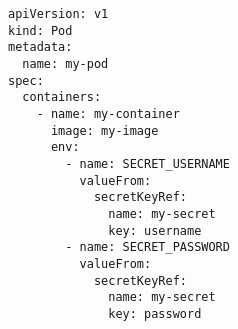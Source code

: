 \begin{verbatim}
apiVersion: v1
kind: Pod
metadata:
  name: my-pod
spec:
  containers:
    - name: my-container
      image: my-image
      env:
        - name: SECRET_USERNAME
          valueFrom:
            secretKeyRef:
              name: my-secret
              key: username
        - name: SECRET_PASSWORD
          valueFrom:
            secretKeyRef:
              name: my-secret
              key: password
\end{verbatim}